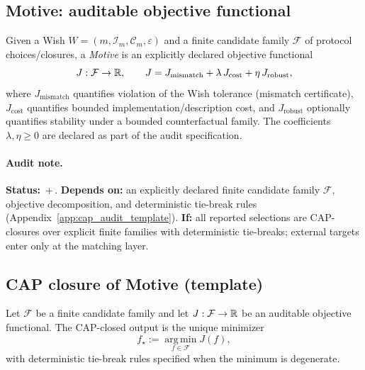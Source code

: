 \subsection{Motive: auditable objective functional}\label{subsec:motive_objective_functional}

\begin{definition}\label{def:motive_objective_functional}
\InterfaceTag Given a Wish $W=(m,\mathcal{I}_m,\mathcal{C}_m,\varepsilon)$ and a finite candidate family $\mathcal{F}$ of protocol choices/closures, a \emph{Motive} is an explicitly declared objective functional
\[
J:\mathcal{F}\to \mathbb{R},
\qquad
J = J_{\mathrm{mismatch}} + \lambda\,J_{\mathrm{cost}} + \eta\,J_{\mathrm{robust}},
\]
where $J_{\mathrm{mismatch}}$ quantifies violation of the Wish tolerance (mismatch certificate), $J_{\mathrm{cost}}$ quantifies bounded implementation/description cost, and $J_{\mathrm{robust}}$ optionally quantifies stability under a bounded counterfactual family.
The coefficients $\lambda,\eta\ge 0$ are declared as part of the audit specification.
\end{definition}

\paragraph{Audit note.}
\AuditTag \textbf{Status:} \AuditTag\,+\,\InterfaceTag.
\textbf{Depends on:} an explicitly declared finite candidate family $\mathcal{F}$, objective decomposition, and deterministic tie-break rules (Appendix~\ref{app:cap_audit_template}).
\textbf{If:} all reported selections are CAP-closures over explicit finite families with deterministic tie-breaks; external targets enter only at the matching layer.

\subsection{CAP closure of Motive (template)}\label{subsec:motive_cap_closure_template}

\begin{definition}\label{def:motive_cap_closure}
\AuditTag Let $\mathcal{F}$ be a finite candidate family and let $J:\mathcal{F}\to\mathbb{R}$ be an auditable objective functional.
The CAP-closed output is the unique minimizer
\[
f_\star := \operatorname*{arg\,min}_{f\in\mathcal{F}} J(f),
\]
with deterministic tie-break rules specified when the minimum is degenerate.
\end{definition}

